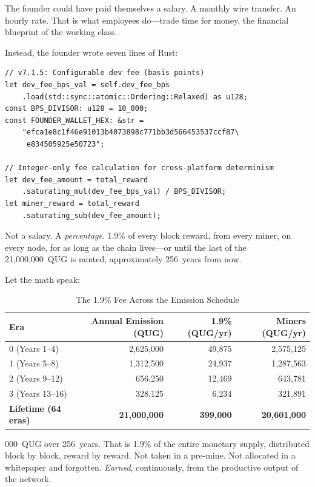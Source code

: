 \documentclass[11pt,a4paper]{article}
\begin{document}
\vspace{0.3cm}

The founder could have paid themselves a salary. A monthly wire transfer.
An hourly rate. That is what employees do---trade time for money, the
financial blueprint of the working class.

Instead, the founder wrote seven lines of Rust:

\begin{lstlisting}[caption={The 1.9\% Fee in Consensus (\texttt{block\_producer.rs})}]
// v7.1.5: Configurable dev fee (basis points)
let dev_fee_bps_val = self.dev_fee_bps
    .load(std::sync::atomic::Ordering::Relaxed) as u128;
const BPS_DIVISOR: u128 = 10_000;
const FOUNDER_WALLET_HEX: &str =
    "efca1e8c1f46e91013b4073898c771bb3d566453537ccf87\
     e834505925e50723";

// Integer-only fee calculation for cross-platform determinism
let dev_fee_amount = total_reward
    .saturating_mul(dev_fee_bps_val) / BPS_DIVISOR;
let miner_reward = total_reward
    .saturating_sub(dev_fee_amount);
\end{lstlisting}

Not a salary. A \emph{percentage}. 1.9\% of every block reward, from
every miner, on every node, for as long as the chain lives---or until
the last of the 21{,}000{,}000~QUG is minted, approximately 256~years
from now.

Let the math speak:

\begin{table}[H]
\centering
\caption{The 1.9\% Fee Across the Emission Schedule}
\begin{tabular}{@{}lrrr@{}}
\toprule
\textbf{Era} & \textbf{Annual Emission (QUG)} & \textbf{1.9\% (QUG/yr)} & \textbf{Miners (QUG/yr)} \\
\midrule
0 (Years 1--4)   & 2{,}625{,}000 & 49{,}875  & 2{,}575{,}125 \\
1 (Years 5--8)   & 1{,}312{,}500 & 24{,}937  & 1{,}287{,}563 \\
2 (Years 9--12)  &   656{,}250   & 12{,}469  &   643{,}781   \\
3 (Years 13--16) &   328{,}125   &  6{,}234  &   321{,}891   \\
\midrule
\textbf{Lifetime (64 eras)} & \textbf{21{,}000{,}000} & \textbf{399{,}000} & \textbf{20{,}601{,}000} \\
\bottomrule
\end{tabular}
\end{table}

000~QUG over 256~years. That is 1.9\% of the entire
monetary supply, distributed block by block, reward by reward.
Not taken in a pre-mine. Not allocated in a whitepaper and forgotten.
\emph{Earned}, continuously, from the productive output of the network.
\end{document}
